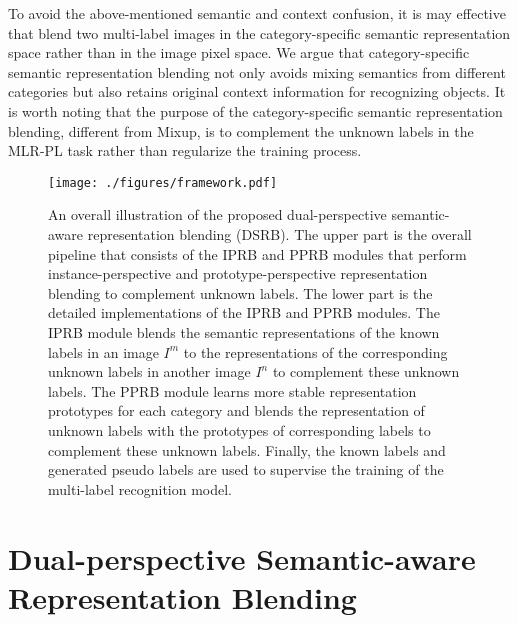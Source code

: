 \documentclass[lettersize,journal]{IEEEtran}
\begin{document}
To avoid the above-mentioned semantic and context confusion, it is may effective that blend two multi-label images in the category-specific semantic representation space rather than in the image pixel space. We argue that category-specific semantic representation blending not only avoids mixing semantics from different categories but also retains original context information for recognizing objects. It is worth noting that the purpose of the category-specific semantic representation blending, different from Mixup, is to complement the unknown labels in the MLR-PL task rather than regularize the training process. 

\begin{figure*}[!t]
   \centering
   \texttt{[image: ./figures/framework.pdf]}
   \caption{An overall illustration of the proposed dual-perspective semantic-aware representation blending (DSRB). The upper part is the overall pipeline that consists of the IPRB and PPRB modules that perform instance-perspective and prototype-perspective representation blending to complement unknown labels. The lower part is the detailed implementations of the IPRB and PPRB modules. The IPRB module blends the semantic representations of the known labels in an image $I^m$ to the representations of the corresponding unknown labels in another image $I^n$ to complement these unknown labels. The PPRB module learns more stable representation prototypes for each category and blends the representation of unknown labels with the prototypes of corresponding labels to complement these unknown labels. Finally, the known labels and generated pseudo labels are used to supervise the training of the multi-label recognition model.}
   \label{fig:framework}
\end{figure*}

\section{Dual-perspective Semantic-aware Representation Blending} \label{sec:method}
\end{document}
